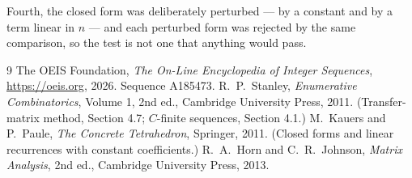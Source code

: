 \documentclass[11pt,a4paper]{article}
\theoremstyle{plain}
\theoremstyle{definition}
\begin{document}
Fourth, the closed form was deliberately perturbed --- by a constant and by a term linear in
$n$ --- and each perturbed form was rejected by the same comparison, so the test is not one
that anything would pass.

\begin{thebibliography}{9}
 The OEIS Foundation, \emph{The On-Line Encyclopedia of Integer
Sequences}, \url{https://oeis.org}, 2026. Sequence A185473.
 R.~P.~Stanley, \emph{Enumerative Combinatorics}, Volume 1, 2nd ed.,
Cambridge University Press, 2011. (Transfer-matrix method, Section 4.7; $C$-finite sequences,
Section 4.1.)
 M.~Kauers and P.~Paule, \emph{The Concrete Tetrahedron}, Springer, 2011.
(Closed forms and linear recurrences with constant coefficients.)
 R.~A.~Horn and C.~R.~Johnson, \emph{Matrix Analysis}, 2nd ed., Cambridge
University Press, 2013.
\end{thebibliography}
\end{document}

